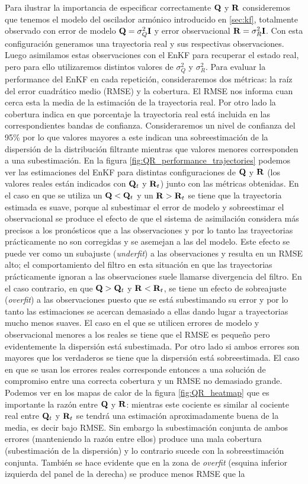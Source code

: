 Para ilustrar la importancia de especificar correctamente $\mathbf{Q}$ y $\mathbf{R}$ consideremos que tenemos el modelo del oscilador armónico introducido en \ref{sec:kf}, totalmente observado con error de modelo $\mathbf{Q} = \sigma_Q^2 \mathbf{I}$ y error observacional $\mathbf{R} = \sigma_R^2 \mathbf{I}$. Con esta configuración generamos una trayectoria real y sus respectivas observaciones. Luego asimilamos estas observaciones con el EnKF para recuperar el estado real, pero para ello utilizaremos distintos valores de $\sigma_Q^2$ y $\sigma_R^2$. Para evaluar la performance del EnKF en cada repetición, consideraremos dos métricas: la raíz del error cuadrático medio (RMSE) y la cobertura. El RMSE nos informa cuan cerca esta la media de la estimación de la trayectoria real. Por otro lado la cobertura indica en que porcentaje la trayectoria real está incluida en las correspondientes bandas de confianza. Consideraremos un nivel de confianza del 95\% por lo que valores mayores a este indican una sobreestimación de la dispersión de la distribución filtrante mientras que valores menores corresponden a una subestimación. En la figura \ref{fig:QR_performance_trajectories} podemos ver las estimaciones del EnKF para distintas configuraciones de $\mathbf{Q}$ y $\mathbf{R}$ (los valores reales están indicados con $\mathbf{Q}_t$ y $\mathbf{R}_t$) junto con las métricas obtenidas. En el caso en que se utiliza un $\mathbf{Q} < \mathbf{Q}_t$ y un $\mathbf{R} > \mathbf{R}_t$ se tiene que la trayectoria estimada es suave, porque al subestimar el error de modelo y sobreestimar el observacional se produce el efecto de que el sistema de asimilación considera más precisos a los pronósticos que a las observaciones y por lo tanto las trayectorias prácticamente no son corregidas y se asemejan a las del modelo. Este efecto se puede ver como un subajuste (\textit{underfit}) a las observaciones y resulta en un RMSE alto; el comportamiento del filtro en esta situación en que las trayectorias prácticamente ignoran a las observaciones suele llamarse divergencia del filtro. En el caso contrario, en que $\mathbf{Q} > \mathbf{Q}_t$ y $\mathbf{R} < \mathbf{R}_t$, se tiene un efecto de sobreajuste (\textit{overfit}) a las observaciones puesto que se está subestimando su error y por lo tanto las estimaciones se acercan demasiado a ellas dando lugar a trayectorias mucho menos suaves. El caso en el que se utilicen errores de modelo y observacional menores a los reales se tiene que el RMSE es pequeño pero evidentemente la dispersión está subestimada. Por otro lado si ambos errores son mayores que los verdaderos se tiene que la dispersión está sobreestimada. El caso en que se usan los errores reales corresponde entonces a una solución de compromiso entre una correcta cobertura y un RMSE no demasiado grande. Podemos ver en los mapas de calor de la figura \ref{fig:QR_heatmap} que es importante la razón entre $\mathbf{Q}$ y $\mathbf{R}$: mientras este cociente es similar al cociente real entre $\mathbf{Q}_t$ y $\mathbf{R}_t$ se tendrá una estimación aproximadamente buena de la media, es decir bajo RMSE. Sin embargo la subestimación conjunta de ambos errores (manteniendo la razón entre ellos) produce una mala cobertura (subestimación de la dispersión) y lo contrario sucede con la sobreestimación conjunta. También se hace evidente que en la zona de \textit{overfit} (esquina inferior izquierda del panel de la derecha) se produce menos RMSE que la 
